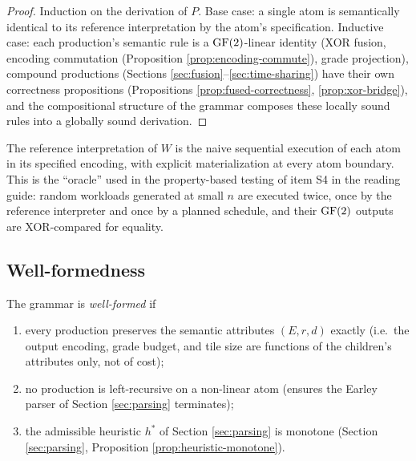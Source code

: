\begin{proof}
  Induction on the derivation of $P$. Base case: a
  single atom is semantically identical to its
  reference interpretation by the atom's
  specification. Inductive case: each production's
  semantic rule is a $\operatorname{GF}(2)$-linear identity
  (XOR fusion, encoding commutation
  (Proposition \ref{prop:encoding-commute}), grade
  projection), compound productions
  (Sections \ref{sec:fusion}--\ref{sec:time-sharing})
  have their own correctness propositions
  (Propositions \ref{prop:fused-correctness},
  \ref{prop:xor-bridge}), and the compositional
  structure of the grammar composes these locally
  sound rules into a globally sound derivation.
\end{proof}

\begin{remark}
  The reference interpretation of $W$ is the naive
  sequential execution of each atom in its specified
  encoding, with explicit materialization at every
  atom boundary. This is the ``oracle'' used in the
  property-based testing of item S4 in the reading
  guide: random workloads generated at small $n$ are
  executed twice, once by the reference interpreter
  and once by a planned schedule, and their $\operatorname{GF}(2)$
  outputs are XOR-compared for equality.
\end{remark}

\subsection{Well-formedness}

\begin{definition}\label{def:wf-grammar}
  The grammar is \emph{well-formed} if
  \begin{enumerate}[nosep,label=(\roman*)]
    \item every production preserves the semantic
      attributes $(E, r, d)$ exactly (i.e.\ the output
      encoding, grade budget, and tile size are
      functions of the children's attributes only, not
      of cost);
    \item no production is left-recursive on a
      non-linear atom (ensures the Earley parser of
      Section \ref{sec:parsing} terminates);
    \item the admissible heuristic $h^*$ of
      Section \ref{sec:parsing} is monotone
      (Section \ref{sec:parsing}, Proposition
      \ref{prop:heuristic-monotone}).
  \end{enumerate}
\end{definition}


